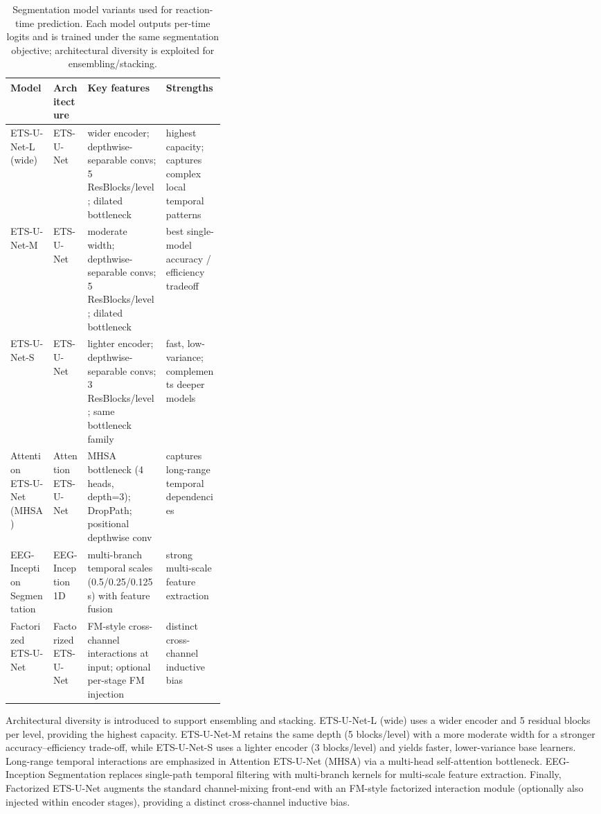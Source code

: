 \documentclass[12pt]{article}
\begin{document}
\begin{table}[t!]
\caption{Segmentation model variants used for reaction-time prediction. Each model outputs per-time logits and is trained under the same segmentation objective; architectural diversity is exploited for ensembling/stacking.}
\label{tab:rt_seg_models}
\small
\centering
\renewcommand{\arraystretch}{1.2}
\setlength{\tabcolsep}{4pt}

\begin{tabularx}{\linewidth}{@{}
  >{\RaggedRight\arraybackslash}p{0.20\linewidth}
  >{\RaggedRight\arraybackslash}p{0.16\linewidth}
  >{\RaggedRight\arraybackslash}X
  >{\RaggedRight\arraybackslash}X
@{}}
\hline
\textbf{Model} & \textbf{Architecture} & \textbf{Key features} & \textbf{Strengths} \\
\hline

ETS-U-Net-L (wide)
& ETS-U-Net
& wider encoder; depthwise-separable convs; 5 ResBlocks/level; dilated bottleneck
& highest capacity; captures complex local temporal patterns \\

ETS-U-Net-M
& ETS-U-Net
& moderate width; depthwise-separable convs; 5 ResBlocks/level; dilated bottleneck
& best single-model accuracy / efficiency tradeoff \\

ETS-U-Net-S
& ETS-U-Net
& lighter encoder; depthwise-separable convs; 3 ResBlocks/level; same bottleneck family
& fast, low-variance; complements deeper models \\

Attention ETS-U-Net (MHSA)
& Attention ETS-U-Net
& MHSA bottleneck (4 heads, depth=3); DropPath; positional depthwise conv
& captures long-range temporal dependencies \\

EEG-Inception Segmentation
& EEG-Inception 1D
& multi-branch temporal scales (0.5/0.25/0.125\,s) with feature fusion
& strong multi-scale feature extraction \\

Factorized ETS-U-Net
& Factorized ETS-U-Net
& FM-style cross-channel interactions at input; optional per-stage FM injection
& distinct cross-channel inductive bias \\
\hline
\end{tabularx}
\end{table}

Architectural diversity is introduced to support ensembling and stacking. ETS-U-Net-L (wide) uses a wider encoder and
5 residual blocks per level, providing the highest capacity. ETS-U-Net-M retains the same depth (5 blocks/level) with a
more moderate width for a stronger accuracy--efficiency trade-off, while ETS-U-Net-S uses a lighter encoder
(3 blocks/level) and yields faster, lower-variance base learners. Long-range temporal interactions are emphasized in
Attention ETS-U-Net (MHSA) via a multi-head self-attention bottleneck. EEG-Inception Segmentation replaces single-path temporal filtering
with multi-branch kernels for multi-scale feature extraction. Finally, Factorized ETS-U-Net augments the standard channel-mixing
front-end with an FM-style factorized interaction module (optionally also injected within encoder stages), providing a
distinct cross-channel inductive bias.
\end{document}
